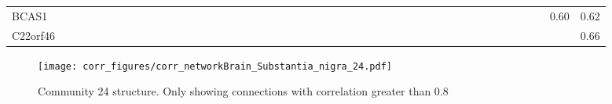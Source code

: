 \begin{longtable}{lrrrrrrrrrrrrrrrrrrrrrrrrrrrrrrrrrrrrrrrrrrrrrr}
BCAS1     &              &             &              &              &             &            &             &            &             &           &            &              &               &            &              &              &               &            &             &            &             &              &             &           &             &              &             &                &                &             &            &            &              &             &              &                &             &                 &               &             &           &             &                &             &           0.60 &        0.62 \\
C22orf46  &              &             &              &              &             &            &             &            &             &           &            &              &               &            &              &              &               &            &             &            &             &              &             &           &             &              &             &                &                &             &            &            &              &             &              &                &             &                 &               &             &           &             &                &             &                &        0.66 \\
\end{longtable}


\begin{figure}[h!]
\centering
\texttt{[image: corr\_figures/corr\_networkBrain\_Substantia\_nigra\_24.pdf]}
\caption{Community 24 structure. Only showing connections with correlation greater than 0.8}
\end{figure}





